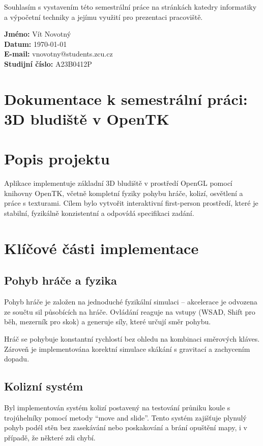 \documentclass[12pt,a4paper]{article}
\begin{document}
\noindent
Souhlasím s vystavením této semestrální práce na stránkách katedry informatiky a výpočetní techniky a jejímu využití pro prezentaci pracoviště.

\vspace{1cm}

\begin{flushleft}
\textbf{Jméno:} Vít Novotný \\
\textbf{Datum:} \today \\
\textbf{E-mail:} vnovotny@students.zcu.cz \\
\textbf{Studijní číslo:} A23B0412P
\end{flushleft}

\vspace{0.5cm}

\section*{Dokumentace k semestrální práci: 3D bludiště v OpenTK}

\section{Popis projektu}
Aplikace implementuje základní 3D bludiště v prostředí OpenGL pomocí knihovny OpenTK, včetně kompletní fyziky pohybu hráče, kolizí, osvětlení a práce s texturami. Cílem bylo vytvořit interaktivní first-person prostředí, které je stabilní, fyzikálně konzistentní a odpovídá specifikaci zadání.

\section{Klíčové části implementace}

\subsection*{Pohyb hráče a fyzika}
Pohyb hráče je založen na jednoduché fyzikální simulaci – akcelerace je odvozena ze součtu sil působících na hráče. Ovládání reaguje na vstupy (WSAD, Shift pro běh, mezerník pro skok) a generuje síly, které určují směr pohybu.

Hráč se pohybuje konstantní rychlostí bez ohledu na kombinaci směrových kláves. Zároveň je implementována korektní simulace skákání s gravitací a zachycením dopadu.

\subsection*{Kolizní systém}
Byl implementován systém kolizí postavený na testování průniku koule s trojúhelníky pomocí metody ``move and slide''. Tento systém zajišťuje plynulý pohyb podél stěn bez zasekávání nebo poskakování a brání opuštění mapy, i v případě, že některé zdi chybí.
\end{document}
